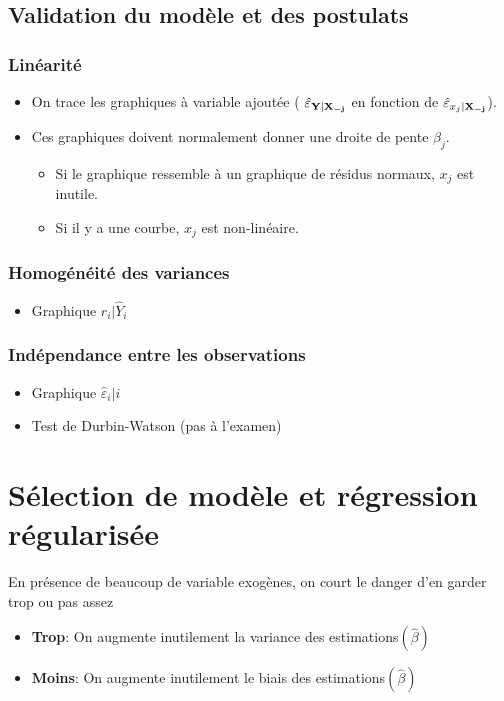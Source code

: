 \documentclass[10pt, french]{article}
\begin{document}
\begin{multicols*}{3}
\subsection*{Validation du modèle et des postulats}
\subsubsection*{Linéarité}
\begin{itemize}
\item On trace les graphiques à variable ajoutée ( $\hat{\varepsilon}_{\mathbf{Y} | \mathbf{X_{-j}}}$ en fonction de $\hat{\varepsilon}_{x_j | \mathbf{X_{-j}}}$).
\item Ces graphiques doivent normalement donner une droite de pente $\beta_j$.
\begin{itemize}
	\item Si le graphique ressemble à un graphique de résidus normaux, $x_j$ est inutile.
	\item Si il y a une courbe, $x_j$ est non-linéaire.
\end{itemize}
\end{itemize}

\subsubsection*{Homogénéité des variances}
\begin{itemize}
\item Graphique $r_i | \hat{Y}_i$
\end{itemize}

\subsubsection*{Indépendance entre les observations}
\begin{itemize}
\item Graphique $\hat{\varepsilon}_i | i$
\item Test de Durbin-Watson (pas à l'examen)
\end{itemize}


\section{Sélection de modèle et régression régularisée}
En présence de beaucoup de variable exogènes, on court le danger d'en garder trop ou pas assez
\begin{itemize}
	\item \textbf{Trop}: On augmente inutilement la variance des estimations$(\hat{\beta})$
	\item \textbf{Moins}: On augmente inutilement le biais des estimations$(\hat{\beta})$
\end{itemize}


\end{multicols*}
\end{document}
